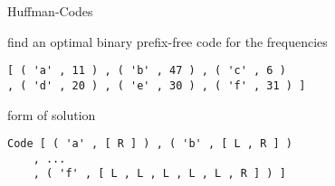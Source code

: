 \begin{slide}{Huffman-Codes}

find an optimal binary prefix-free code for the frequencies
\begin{verbatim}
[ ( 'a' , 11 ) , ( 'b' , 47 ) , ( 'c' , 6 ) 
, ( 'd' , 20 ) , ( 'e' , 30 ) , ( 'f' , 31 ) ]
\end{verbatim}
    
\bigskip
form of solution
\begin{verbatim}
Code [ ( 'a' , [ R ] ) , ( 'b' , [ L , R ] ) 
    , ...
    , ( 'f' , [ L , L , L , L , L , R ] ) ]
\end{verbatim}

\end{slide}
